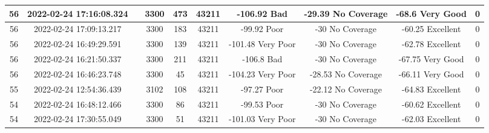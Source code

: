 \begin{longtable*}{|c|c|c|c|c|c|c|c|c|c|}
56&2022-02-24 17:16:08.324&&3300&473&43211& -106.92   Bad         & -29.39    No Coverage & -68.6     Very Good   & 0\\\hline
{}56&2022-02-24 17:09:13.217&&3300&183&43211& -99.92    Poor        & -30       No Coverage & -60.25    Excellent   & 0\\\hline
{}56&2022-02-24 16:49:29.591&&3300&139&43211& -101.48   Very Poor   & -30       No Coverage & -62.78    Excellent   & 0\\\hline
{}56&2022-02-24 16:21:50.337&&3300&211&43211& -106.8    Bad         & -30       No Coverage & -67.75    Very Good   & 0\\\hline
{}56&2022-02-24 16:46:23.748&&3300&45&43211& -104.23   Very Poor   & -28.53    No Coverage & -66.11    Very Good   & 0\\\hline
{}55&2022-02-24 12:54:36.439&&3102&108&43211& -97.27    Poor        & -22.12    No Coverage & -64.83    Excellent   & 0\\\hline
{}54&2022-02-24 16:48:12.466&&3300&86&43211& -99.53    Poor        & -30       No Coverage & -60.62    Excellent   & 0\\\hline
{}54&2022-02-24 17:30:55.049&&3300&51&43211& -101.03   Very Poor   & -30       No Coverage & -62.03    Excellent   & 0\\\hline

\end{longtable*}
